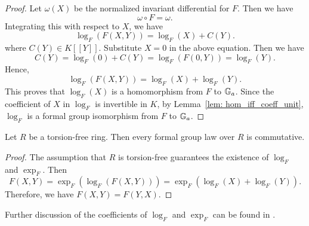 \begin{proof}
    Let $\omega(X)$ be the normalized invariant differential for $F$. Then we have
    \[\omega \circ F = \omega .\]
    Integrating this with respect to $X$, we have
    \[\log_F(F(X,Y)) = \log_F(X) + C(Y). \]
    where $C(Y) \in K[\![Y]\!]$. Substitute $X = 0$ in the above equation. Then we have
    \[ C(Y) = \log_F (0) + C (Y) = \log_F(F(0,Y)) = \log_F (Y). \]
    Hence,
    \[\log_F(F(X,Y)) = \log_F(X) + \log_F(Y). \]
    This proves that $\log_F(X)$ is a homomorphism from $F$ to $\mathbb{G}_a$.
    Since the coefficient of $X$ in $\log_F$ is invertible in $K$,
    by Lemma~\ref{lem: hom_iff_coeff_unit}, $\log_F$ is a formal group isomorphism
    from $F$ to $\mathbb{G}_a$.
\end{proof}

\begin{corollary}
    Let $R$ be a torsion-free ring. Then every formal group law over $R$ is commutative.
    \label{cor: torsion_free_comm}
\end{corollary}

\begin{proof}
    The assumption that $R$ is torsion-free guarantees the existence of $\log_F$ and $\exp_F$.
    Then
        \[F(X,Y) = \exp_F (\log_F (F(X,Y))) = \exp_F(\log_F(X) + \log_F(Y)). \]
    Therefore, we have $F(X,Y) = F(Y,X)$.
\end{proof}

Further discussion of the coefficients of $\log_F$ and $\exp_F$ can be found in
\cite{silverman2009arithmetic}.